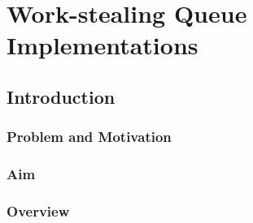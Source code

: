 
\part{Work-stealing Queue Implementations}
\label{part:queues}

\chapter{Introduction}
\label{chap:queues-introduction}

\section{Problem and Motivation}
\label{sec:queues-intro-problem-and-motivation}


\section{Aim}
\label{sec:queues-intro-aim}


\section{Overview}
\label{sec:queues-intro-overview}


